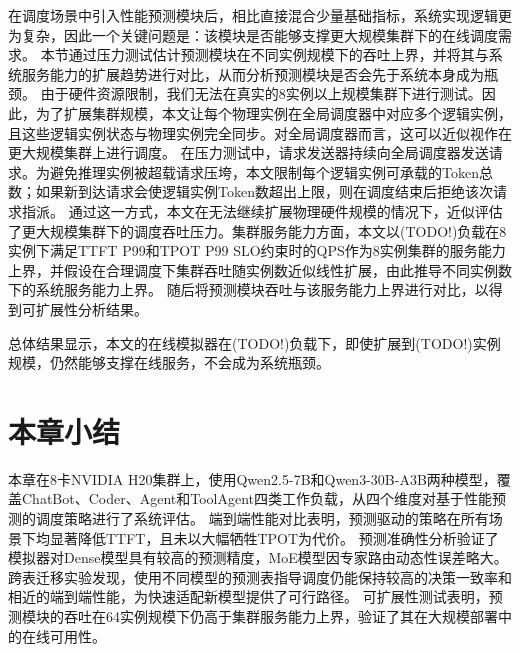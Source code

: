 在调度场景中引入性能预测模块后，相比直接混合少量基础指标，系统实现逻辑更为复杂，因此一个关键问题是：该模块是否能够支撑更大规模集群下的在线调度需求。
本节通过压力测试估计预测模块在不同实例规模下的吞吐上界，并将其与系统服务能力的扩展趋势进行对比，从而分析预测模块是否会先于系统本身成为瓶颈。
由于硬件资源限制，我们无法在真实的8实例以上规模集群下进行测试。因此，为了扩展集群规模，本文让每个物理实例在全局调度器中对应多个逻辑实例，且这些逻辑实例状态与物理实例完全同步。对全局调度器而言，这可以近似视作在更大规模集群上进行调度。
在压力测试中，请求发送器持续向全局调度器发送请求。为避免推理实例被超载请求压垮，本文限制每个逻辑实例可承载的Token总数；如果新到达请求会使逻辑实例Token数超出上限，则在调度结束后拒绝该次请求指派。
通过这一方式，本文在无法继续扩展物理硬件规模的情况下，近似评估了更大规模集群下的调度吞吐压力。集群服务能力方面，本文以(TODO!)负载在8实例下满足TTFT P99和TPOT P99 SLO约束时的QPS作为8实例集群的服务能力上界，并假设在合理调度下集群吞吐随实例数近似线性扩展，由此推导不同实例数下的系统服务能力上界。
随后将预测模块吞吐与该服务能力上界进行对比，以得到可扩展性分析结果。

总体结果显示，本文的在线模拟器在(TODO!)负载下，即使扩展到(TODO!)实例规模，仍然能够支撑在线服务，不会成为系统瓶颈。

\section{本章小结}
本章在8卡NVIDIA H20集群上，使用Qwen2.5-7B和Qwen3-30B-A3B两种模型，覆盖ChatBot、Coder、Agent和ToolAgent四类工作负载，从四个维度对基于性能预测的调度策略进行了系统评估。
端到端性能对比表明，预测驱动的策略在所有场景下均显著降低TTFT，且未以大幅牺牲TPOT为代价。
预测准确性分析验证了模拟器对Dense模型具有较高的预测精度，MoE模型因专家路由动态性误差略大。
跨表迁移实验发现，使用不同模型的预测表指导调度仍能保持较高的决策一致率和相近的端到端性能，为快速适配新模型提供了可行路径。
可扩展性测试表明，预测模块的吞吐在64实例规模下仍高于集群服务能力上界，验证了其在大规模部署中的在线可用性。
